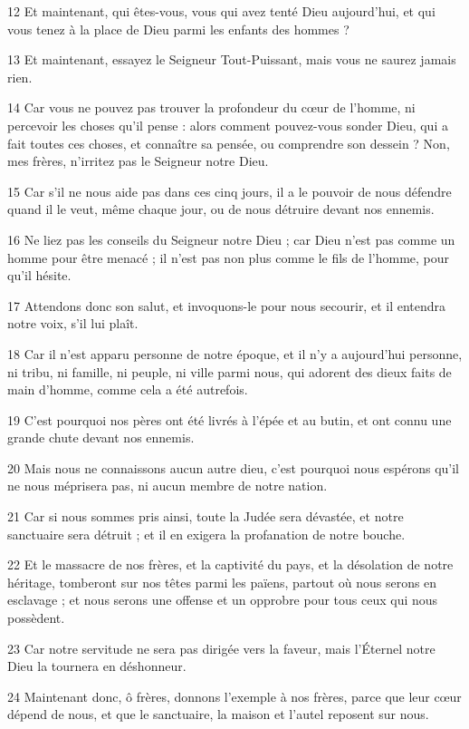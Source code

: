 \par 12 Et maintenant, qui êtes-vous, vous qui avez tenté Dieu aujourd'hui, et qui vous tenez à la place de Dieu parmi les enfants des hommes ?
\par 13 Et maintenant, essayez le Seigneur Tout-Puissant, mais vous ne saurez jamais rien.
\par 14 Car vous ne pouvez pas trouver la profondeur du cœur de l'homme, ni percevoir les choses qu'il pense : alors comment pouvez-vous sonder Dieu, qui a fait toutes ces choses, et connaître sa pensée, ou comprendre son dessein ? Non, mes frères, n'irritez pas le Seigneur notre Dieu.
\par 15 Car s'il ne nous aide pas dans ces cinq jours, il a le pouvoir de nous défendre quand il le veut, même chaque jour, ou de nous détruire devant nos ennemis.
\par 16 Ne liez pas les conseils du Seigneur notre Dieu ; car Dieu n'est pas comme un homme pour être menacé ; il n'est pas non plus comme le fils de l'homme, pour qu'il hésite.
\par 17 Attendons donc son salut, et invoquons-le pour nous secourir, et il entendra notre voix, s'il lui plaît.
\par 18 Car il n'est apparu personne de notre époque, et il n'y a aujourd'hui personne, ni tribu, ni famille, ni peuple, ni ville parmi nous, qui adorent des dieux faits de main d'homme, comme cela a été autrefois.
\par 19 C'est pourquoi nos pères ont été livrés à l'épée et au butin, et ont connu une grande chute devant nos ennemis.
\par 20 Mais nous ne connaissons aucun autre dieu, c'est pourquoi nous espérons qu'il ne nous méprisera pas, ni aucun membre de notre nation.
\par 21 Car si nous sommes pris ainsi, toute la Judée sera dévastée, et notre sanctuaire sera détruit ; et il en exigera la profanation de notre bouche.
\par 22 Et le massacre de nos frères, et la captivité du pays, et la désolation de notre héritage, tomberont sur nos têtes parmi les païens, partout où nous serons en esclavage ; et nous serons une offense et un opprobre pour tous ceux qui nous possèdent.
\par 23 Car notre servitude ne sera pas dirigée vers la faveur, mais l'Éternel notre Dieu la tournera en déshonneur.
\par 24 Maintenant donc, ô frères, donnons l'exemple à nos frères, parce que leur cœur dépend de nous, et que le sanctuaire, la maison et l'autel reposent sur nous.

